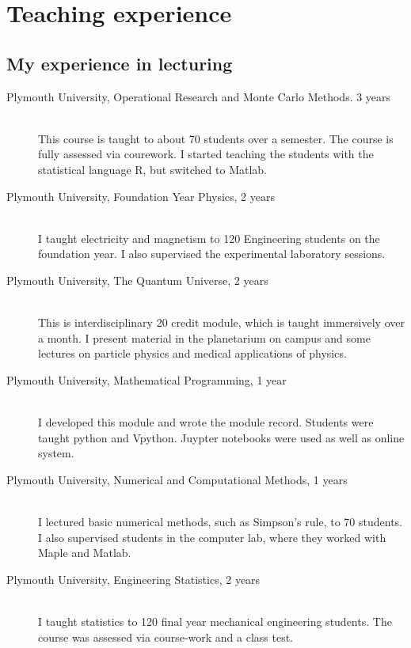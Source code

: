 \documentclass[12pt]{article}
\begin{document}
\FloatBarrier

%
\section{Teaching experience}

\subsection{My experience in lecturing}


\begin{description}

  \item[Plymouth University, Operational Research and Monte Carlo Methods.
3 years] \hfill \\
This course is taught to about 70 students over a semester. The course is fully
assessed via courework. I started teaching the students with the statistical language R, but switched 
to Matlab.

  \item[Plymouth University, Foundation Year Physics,
2 years] \hfill \\
I taught electricity and magnetism to 120 Engineering students
on the foundation year. I also supervised the experimental 
laboratory sessions.

  \item[Plymouth University, The Quantum Universe,
2 years] \hfill \\
This is interdisciplinary 20 credit module, which is taught immersively over a month. 
I present material in the planetarium on campus and some lectures on
particle physics and medical applications of physics.

  \item[Plymouth University, Mathematical Programming,
1 year] \hfill \\
I developed this module and wrote the module record. Students
were taught python and Vpython. Juypter notebooks were used as well
as online system.

  \item[Plymouth University, Numerical and Computational Methods,
1 years] \hfill \\
I lectured basic numerical methods,
such as Simpson's rule,
 to 70 students. I also supervised
students in the computer lab, where they worked with Maple
and Matlab.

  \item[Plymouth University, Engineering Statistics,
2 years] \hfill \\
I taught statistics to 120 final year mechanical engineering 
students. The course was assessed via course-work and a class 
test.


\end{description}
\end{document}
